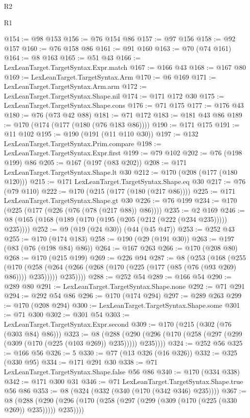 \begin{lexlean}{R2}
\begin{lexlean}{R1}
\begin{coremodule}
{{{{{{{{{{{{{{{{{{{{@154 := @98 @153
@156 := @76 @154 @86
@157 := @97 @156
@158 := @92 @157
@160 := @76 @158 @86
@161 := @91 @160
@163 := @70 (@74 @161)
@164 := @8 @163
@165 := @51 @43
@166 := LexLeanTarget.TargetSyntax.Expr.match
@167 := @166 @43
@168 := @167 @80
@169 := LexLeanTarget.TargetSyntax.Arm
@170 := @6 @169
@171 := LexLeanTarget.TargetSyntax.Arm.arm
@172 := LexLeanTarget.TargetSyntax.Shape.nil
@174 := @171 @172 @30
@175 := LexLeanTarget.TargetSyntax.Shape.cons
@176 := @71 @175
@177 := @176 @43
@180 := @76 (@73 @42 @88)
@181 := @71 @172
@183 := @181 @43 @86
@189 := @170 (@174 (@177 (@180 (@76 @183 @86))))
@190 := @171 @175
@191 := @11 @102
@195 := @190 (@191 (@11 @110 @30))
@197 := @132 LexLeanTarget.TargetSyntax.Prim.compare
@198 := LexLeanTarget.TargetSyntax.Expr.first
@199 := @79 @102
@202 := @76 (@198 @199) @86
@205 := @167 (@197 (@83 @202))
@208 := @171 LexLeanTarget.TargetSyntax.Shape.lt @30
@212 := @170 (@208 (@177 (@180 @120)))
@215 := @171 LexLeanTarget.TargetSyntax.Shape.eq @30
@217 := @76 (@79 @110)
@222 := @170 (@215 (@177 (@180 (@217 @86))))
@225 := @171 LexLeanTarget.TargetSyntax.Shape.gt @30
@226 := @76 @199
@234 := @170 (@225 (@177 (@226 (@76 (@78 (@217 @88)) @86))))
@235 := @2 @169
@246 := @8 (@165 (@168 (@189 (@170 (@195 (@205 (@212 (@222 (@234 @235))))) @235))))
@252 := @9 (@19 (@24 @30)) (@44 (@45 @47))
@253 := @252 @43
@255 := @170 (@174 @183)
@258 := @190 (@29 (@191 @30))
@263 := @197 (@83 (@76 (@198 @84) @86))
@264 := @167 @263
@266 := @170 (@208 @80)
@268 := @170 (@215 @199)
@269 := @226 @94
@287 := @8
    (@253
      (@168
        (@255
          (@170
            (@258 (@264 (@266 (@268 (@170 (@225 (@177 (@85 (@76 (@93 @269) @86)))) @235)))))
            @235))))
@288 := @252 @54
@289 := @166 @54
@290 := @289 @80
@291 := LexLeanTarget.TargetSyntax.Shape.none
@292 := @71 @291
@294 := @292 @54 @86
@296 := @170 (@174 @294)
@297 := @289 @263
@299 := @170 (@208 @294)
@300 := LexLeanTarget.TargetSyntax.Shape.some
@301 := @71 @300
@302 := @301 @54
@303 := LexLeanTarget.TargetSyntax.Expr.second
@309 := @170 (@215 (@302 (@76 (@303 @84) @86)))
@323 := @8
    (@288 (@290 (@296 (@170 (@258 (@297 (@299 (@309 (@170 (@225 (@103 @269)) @235))))) @235))))
@324 := @252 @56
@325 := @166 @56
@326 := 5
@330 := @77 (@13 @326 (@16 @326))
@332 := @325 (@330 @95)
@334 := @171 @291 @30
@338 := @71 LexLeanTarget.TargetSyntax.Shape.false @56 @86
@340 := @170 (@334 @338)
@342 := @171 @300 @31
@346 := @71 LexLeanTarget.TargetSyntax.Shape.true @56 @86
@353 := @8 (@324 (@332 (@340 (@170 (@342 @346) @235))))
@367 := @8
    (@288 (@290 (@296 (@170 (@258 (@297 (@299 (@309 (@170 (@225 (@330 @269)) @235))))) @235))))
}}}}}}}}}}}}}}}}}}}}
\end{coremodule}
\end{lexlean}
\end{lexlean}
